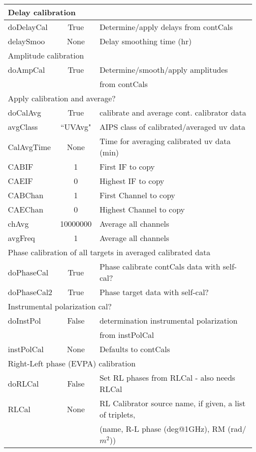 \documentclass[11pt]{article}
\begin{document}
\begin{center}
\begin{tabular}{|l|c|l|}

\hline
\multicolumn{3}{|l|}{Delay calibration} \\
\hline
doDelayCal & True & Determine/apply delays from contCals \\
delaySmoo & None & Delay smoothing time (hr) \\

\hline
\multicolumn{3}{|l|}{Amplitude calibration} \\
\hline
doAmpCal & True & Determine/smooth/apply amplitudes \\
 & & from contCals \\

\hline
\multicolumn{3}{|l|}{Apply calibration and average?} \\
\hline
doCalAvg & True & calibrate and average cont. calibrator data \\
avgClass & ``UVAvg" & AIPS class of calibrated/averaged uv data \\
CalAvgTime & None & Time for averaging calibrated uv data (min) \\
CABIF & 1 & First IF to copy \\
CAEIF & 0 & Highest IF to copy \\
CABChan & 1 & First Channel to copy \\
CAEChan & 0 & Highest Channel to copy \\
chAvg & 10000000 & Average all channels \\
avgFreq & 1 & Average all channels \\

\hline
\multicolumn{3}{|l|}{Phase calibration of all targets in averaged calibrated
  data} \\
\hline
doPhaseCal & True & Phase calibrate contCals data with self-cal? \\
doPhaseCal2 & True & Phase target data with self-cal? \\

\hline
\multicolumn{3}{|l|}{Instrumental polarization cal?} \\
\hline
doInstPol & False & determination instrumental polarization \\
 & & from instPolCal \\
instPolCal & None & Defaults to contCals \\

\hline
\multicolumn{3}{|l|}{Right-Left phase (EVPA) calibration} \\
\hline
doRLCal & False & Set RL phases from RLCal - also needs RLCal \\
RLCal & None & RL Calibrator source name, if given, a list of triplets, \\
 & & (name, R-L phase (deg@1GHz), RM (rad/$m^{2}$)) \\


\end{tabular}
\end{center}
\end{document}

